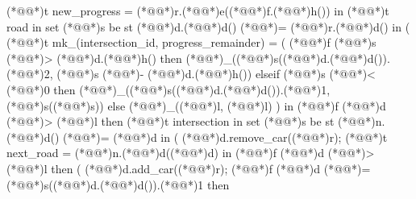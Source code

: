 \documentclass[a4paper]{article}
\begin{document}
\begin{vdm_al}
                (*@@*)t new_progress = (*@@*)r.(*@@*)e((*@@*)f.(*@@*)h()) in 
                    (*@@*)t road in set (*@@*)s be st (*@@*)d.(*@@*)d() (*@\vdmnotcovered{}@*)= (*@@*)r.(*@@*)d() in (
                        (*@@*)t mk_(intersection_id, progress_remainder) = (
                            (*@@*)f (*@@*)s (*@\vdmnotcovered{}@*)> (*@@*)d.(*@@*)h() then
                                (*@@*)_((*@@*)s((*@@*)d.(*@@*)d()).(*@@*)2, (*@@*)s (*@\vdmnotcovered{}@*)- (*@@*)d.(*@@*)h())
                            elseif (*@@*)s (*@\vdmnotcovered{}@*)< (*@\vdmnotcovered{}@*)0 then
                                (*@@*)_((*@@*)s((*@@*)d.(*@@*)d()).(*@@*)1, (*@@*)s((*@@*)s))
                            else (*@@*)_((*@@*)l, (*@@*)l)
                            ) in
                                (*@@*)f (*@@*)d (*@\vdmnotcovered{<}@*)> (*@@*)l then
                                    (*@@*)t intersection in set (*@@*)s be st (*@@*)n.(*@@*)d() (*@\vdmnotcovered{}@*)= (*@@*)d in (
                                        (*@@*)d.remove_car((*@@*)r);
                                        (*@@*)t next_road = (*@@*)n.(*@@*)d((*@@*)d) in
                                            (*@@*)f (*@@*)d (*@\vdmnotcovered{<}@*)> (*@@*)l then (
                                                (*@@*)d.add_car((*@@*)r);
                                                (*@@*)f (*@@*)d (*@\vdmnotcovered{}@*)= (*@@*)s((*@@*)d.(*@@*)d()).(*@@*)1 then

\end{vdm_al}
\end{document}
